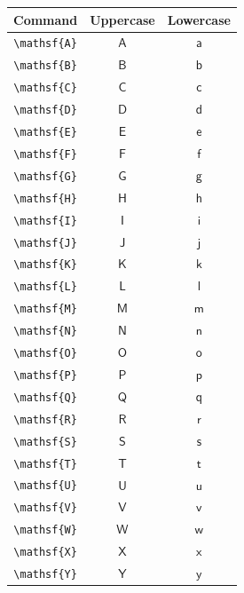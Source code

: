 \documentclass[12pt,a4paper]{article}
\begin{document}
\begin{longtable}{|c|c|c|}
\hline
\textbf{Command} & \textbf{Uppercase} & \textbf{Lowercase} \\
\hline
\verb|\mathsf{A}| & $\mathsf{A}$ & $\mathsf{a}$ \\ %
\verb|\mathsf{B}| & $\mathsf{B}$ & $\mathsf{b}$ \\ %
\verb|\mathsf{C}| & $\mathsf{C}$ & $\mathsf{c}$ \\ %
\verb|\mathsf{D}| & $\mathsf{D}$ & $\mathsf{d}$ \\ %
\verb|\mathsf{E}| & $\mathsf{E}$ & $\mathsf{e}$ \\ %
\verb|\mathsf{F}| & $\mathsf{F}$ & $\mathsf{f}$ \\ %
\verb|\mathsf{G}| & $\mathsf{G}$ & $\mathsf{g}$ \\ %
\verb|\mathsf{H}| & $\mathsf{H}$ & $\mathsf{h}$ \\ %
\verb|\mathsf{I}| & $\mathsf{I}$ & $\mathsf{i}$ \\ %
\verb|\mathsf{J}| & $\mathsf{J}$ & $\mathsf{j}$ \\ %
\verb|\mathsf{K}| & $\mathsf{K}$ & $\mathsf{k}$ \\ %
\verb|\mathsf{L}| & $\mathsf{L}$ & $\mathsf{l}$ \\ %
\verb|\mathsf{M}| & $\mathsf{M}$ & $\mathsf{m}$ \\ %
\verb|\mathsf{N}| & $\mathsf{N}$ & $\mathsf{n}$ \\ %
\verb|\mathsf{O}| & $\mathsf{O}$ & $\mathsf{o}$ \\ %
\verb|\mathsf{P}| & $\mathsf{P}$ & $\mathsf{p}$ \\ %
\verb|\mathsf{Q}| & $\mathsf{Q}$ & $\mathsf{q}$ \\ %
\verb|\mathsf{R}| & $\mathsf{R}$ & $\mathsf{r}$ \\ %
\verb|\mathsf{S}| & $\mathsf{S}$ & $\mathsf{s}$ \\ %
\verb|\mathsf{T}| & $\mathsf{T}$ & $\mathsf{t}$ \\ %
\verb|\mathsf{U}| & $\mathsf{U}$ & $\mathsf{u}$ \\ %
\verb|\mathsf{V}| & $\mathsf{V}$ & $\mathsf{v}$ \\ %
\verb|\mathsf{W}| & $\mathsf{W}$ & $\mathsf{w}$ \\ %
\verb|\mathsf{X}| & $\mathsf{X}$ & $\mathsf{x}$ \\ %
\verb|\mathsf{Y}| & $\mathsf{Y}$ & $\mathsf{y}$ \\ %

\end{longtable}
\end{document}
